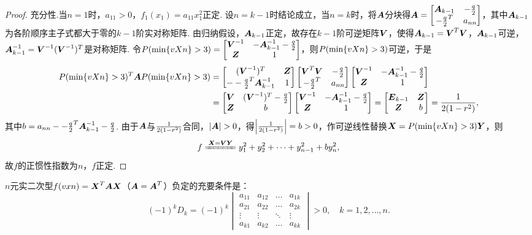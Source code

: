 \begin{theorem}
\begin{proof}
充分性.当\(n=1\)时，\(a_{11} > 0\)，\(f_1(x_1) = a_{11} x_1^2\)正定.
设\(n=k-1\)时结论成立，当\(n=k\)时，将\(\A\)分块得\(\A = \begin{bmatrix}
\A_{k-1} & \a \\
\a^T & a_{nn}
\end{bmatrix}\)，其中\(\A_{k-1}\)为各阶顺序主子式都大于零的\(k-1\)阶实对称矩阵.
由归纳假设，\(\A_{k-1}\)正定，故存在\(k-1\)阶可逆矩阵\(\Q\)，使得\(\A_{k-1} = \Q^T \Q\)，\(\A_{k-1}\)可逆，\(\A_{k-1}^{-1} = \Q^{-1}(\Q^{-1})^T\)是对称矩阵.
令\(\P = \begin{bmatrix}
\Q^{-1} & -\A_{k-1}^{-1} \a \\
\z & 1
\end{bmatrix}\)，则\(\P\)可逆，于是\begin{align*}
\P^T \A \P &= \begin{bmatrix}
(\Q^{-1})^T & \z \\
-\a^T \A_{k-1}^{-1} & 1
\end{bmatrix} \begin{bmatrix}
\Q^T \Q & \a \\
\a^T & a_{nn}
\end{bmatrix} \begin{bmatrix}
\Q^{-1} & -\A_{k-1}^{-1} \a \\
\z & 1
\end{bmatrix} \\
&= \begin{bmatrix}
\Q & (\Q^{-1})^T \a \\
\z & b
\end{bmatrix} \begin{bmatrix}
\Q^{-1} & -\A_{k-1}^{-1} \a \\
\z & 1
\end{bmatrix}
= \begin{bmatrix}
\E_{k-1} & \z \\
\z & b
\end{bmatrix} = \B,
\end{align*}
其中\(b=a_{nn}-\a^T \A_{k-1}^{-1} \a\).
由于\(\A\)与\(\B\)合同，\(\abs{\A} > 0\)，得\(\abs{\B} = b > 0\)，作可逆线性替换\(\x = \P\y\)，则\[
f \xlongequal{\x=\Q\y} y_1^2 + y_2^2 + \dotsb + y_{n-1}^2 + b y_n^2,
\]故\(f\)的正惯性指数为\(n\)，\(f\)正定.
\end{proof}
\end{theorem}

\begin{corollary}
\(n\)元实二次型\(f(\v{x}{n}) = \x^T\A\x\)（\(\A=\A^T\)）负定的充要条件是：\[
(-1)^k D_k = (-1)^k \begin{vmatrix}
a_{11} & a_{12} & \dots & a_{1k} \\
a_{21} & a_{22} & \dots & a_{2k} \\
\vdots & \vdots & \ddots & \vdots \\
a_{k1} & a_{k2} & \dots & a_{kk}
\end{vmatrix} > 0,
\quad k=1,2,\dotsc,n.
\]
\end{corollary}


